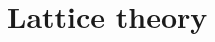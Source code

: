 \documentclass[10pt,twocolumn,twoside]{IEEEtran}
\begin{document}

\section{Lattice theory}\label{sec:lattice-theory}
\end{document}
